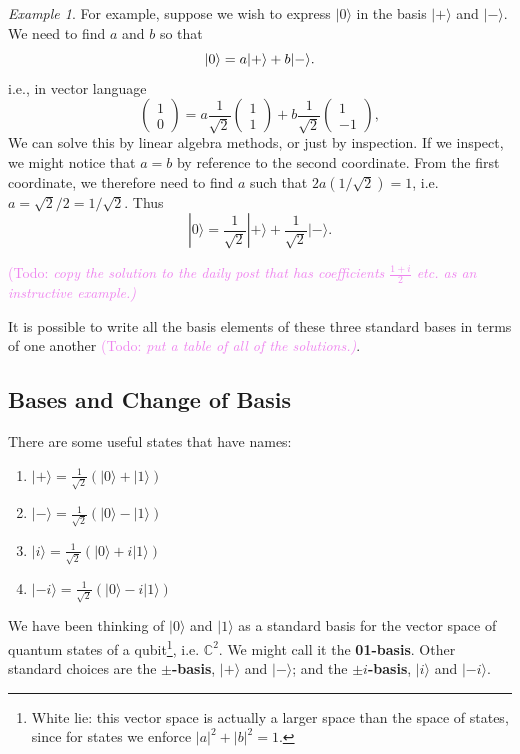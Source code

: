 \documentclass{article}
\theoremstyle{plain}
\theoremstyle{definition}
\theoremstyle{remark}
\newtheorem{example}[theorem]{Example}
\numberwithin{theorem}{section}
\newcommand{\KS}[1]{\textcolor{violet}{{\sf (Todo:} {\sl{#1})}}}
\newcommand{\KS}[1]{}
\newcommand{\CC}{\mathbb{C}}
\begin{document}
\begin{example}
For example, suppose we wish to express $|0\rangle$ in the basis $|+\rangle$ and $|-\rangle$.
We need to find $a$ and $b$ so that
\[
|0 \rangle = a | + \rangle + b | - \rangle.
\]
i.e., in vector language
\[
\begin{pmatrix} 1 \\ 0 \end{pmatrix} =
a
 \frac{1}{\sqrt{2}}
\begin{pmatrix} 1 \\ 1 \end{pmatrix} + 
b
\frac{1}{\sqrt{2}}
\begin{pmatrix} 1 \\ -1 \end{pmatrix},
\]
We can solve this by linear algebra methods, or just by inspection.  If we inspect, we might notice that $a=b$ by reference to the second coordinate.  From the first coordinate, we therefore need to find $a$ such that $2a (1/\sqrt{2}) = 1$, i.e. $a  =\sqrt{2}/2 = 1/\sqrt{2}$.  Thus
\[
|0\rangle = \frac{1}{\sqrt{2}} | + \rangle + \frac{1}{\sqrt{2}} | - \rangle.
\]
\end{example}

\KS{copy the solution to the daily post that has coefficients $\frac{1+i}{2}$ etc. as an instructive example.}

It is possible to write all the basis elements of these three standard bases in terms of one another \KS{put a table of all of the solutions.}. 


\subsection{Bases and Change of Basis}

There are some useful states that have names:
\begin{enumerate}
	\item $|+\rangle = \frac{1}{\sqrt{2}}\left(|0\rangle + |1\rangle\right)$ 
	\item $|-\rangle = \frac{1}{\sqrt{2}}\left(|0\rangle - |1\rangle\right)$ 
	\item $|i\rangle = \frac{1}{\sqrt{2}}\left(|0\rangle +i|1\rangle\right)$ 
	\item $|-i\rangle = \frac{1}{\sqrt{2}}\left(|0\rangle -i |1\rangle\right)$
\end{enumerate}

We have been thinking of $|0\rangle$ and $|1\rangle$ as a standard basis for the vector space of quantum states of a qubit\footnote{White lie:  this vector space is actually a larger space than the space of states, since for states we enforce $|a|^2 + |b|^2=1$.}, i.e. $\CC^2$.  We might call it the \textbf{01-basis}.  Other standard choices are the \textbf{$\pm$-basis}, $|+\rangle$ and $|-\rangle$; and the \textbf{$\pm i$-basis}, $|i\rangle$ and $|-i\rangle$.
\end{document}
